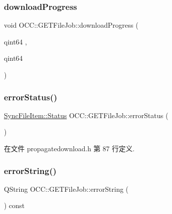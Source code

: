 \subsubsection{\texorpdfstring{download\+Progress}{downloadProgress}}
{\footnotesize\ttfamily void O\+C\+C\+::\+G\+E\+T\+File\+Job\+::download\+Progress (\begin{DoxyParamCaption}\item[{qint64}]{,  }\item[{qint64}]{ }\end{DoxyParamCaption})\hspace{0.3cm}{\ttfamily [signal]}}

\mbox{\label{class_o_c_c_1_1_g_e_t_file_job_a35a26844eff92a8ac92f450b22a908c4}} 
\subsubsection{\texorpdfstring{error\+Status()}{errorStatus()}}
{\footnotesize\ttfamily \hyperlink{class_o_c_c_1_1_sync_file_item_a149ade86eddd9661587bfbc9bcbca408}{Sync\+File\+Item\+::\+Status} O\+C\+C\+::\+G\+E\+T\+File\+Job\+::error\+Status (\begin{DoxyParamCaption}{ }\end{DoxyParamCaption})}



在文件 propagatedownload.\+h 第 87 行定义.

\mbox{\label{class_o_c_c_1_1_g_e_t_file_job_a3ceb7cee2cf75c168baab212381f2026}} 
\subsubsection{\texorpdfstring{error\+String()}{errorString()}}
{\footnotesize\ttfamily Q\+String O\+C\+C\+::\+G\+E\+T\+File\+Job\+::error\+String (\begin{DoxyParamCaption}{ }\end{DoxyParamCaption}) const}



